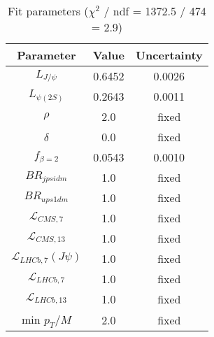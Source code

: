 \begin{table}[h!]
\centering
\begin{tabular}{c|c|c}
Parameter & Value & Uncertainty \\
\hline
$L_{J/\psi}$ & 0.6452 & 0.0026 \\
$L_{\psi(2S)}$ & 0.2643 & 0.0011 \\
$\rho$ & 2.0 & fixed \\
$\delta$ & 0.0 & fixed \\
$f_{\beta=2}$ & 0.0543 & 0.0010 \\
$BR_{jpsidm}$ & 1.0 & fixed \\
$BR_{ups1dm}$ & 1.0 & fixed \\
$\mathcal L_{CMS,7}$ & 1.0 & fixed \\
$\mathcal L_{CMS,13}$ & 1.0 & fixed \\
$\mathcal L_{LHCb,7}(J\psi)$ & 1.0 & fixed \\
$\mathcal L_{LHCb,7}$ & 1.0 & fixed \\
$\mathcal L_{LHCb,13}$ & 1.0 & fixed \\
min $p_T/M$ & 2.0 & fixed \\
\end{tabular}
\caption{Fit parameters ($\chi^2$ / ndf = 1372.5 / 474 = 2.9)}
\end{table}
